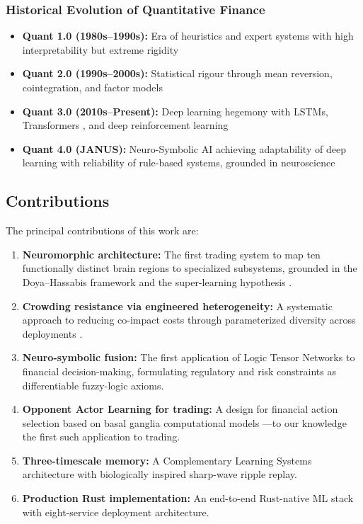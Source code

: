\documentclass[12pt, a4paper]{article}
\begin{document}
\subsubsection*{Historical Evolution of Quantitative Finance}

\begin{itemize}
	\item \textbf{Quant 1.0 (1980s--1990s):} Era of heuristics and expert systems with high interpretability but extreme rigidity
	\item \textbf{Quant 2.0 (1990s--2000s):} Statistical rigour through mean reversion, cointegration, and factor models \citep{fama1993common}
	\item \textbf{Quant 3.0 (2010s--Present):} Deep learning hegemony with LSTMs, Transformers \citep{vaswani2017attention}, and deep reinforcement learning \citep{sutton2018reinforcement}
	\item \textbf{Quant 4.0 (JANUS):} Neuro-Symbolic AI achieving adaptability of deep learning with reliability of rule-based systems, grounded in neuroscience
\end{itemize}

\subsection{Contributions}
\label{sec:contributions}

The principal contributions of this work are:

\begin{enumerate}
	\item \textbf{Neuromorphic architecture:} The first trading system to map ten functionally distinct brain regions to specialized subsystems, grounded in the Doya--Hassabis framework \citep{doya1999computations, hassabis2017neuroscience} and the super-learning hypothesis \citep{caligiore2019superlearning}.
	\item \textbf{Crowding resistance via engineered heterogeneity:} A systematic approach to reducing co-impact costs through parameterized diversity across deployments \citep{wagner2011diversity, demiguel2021crowding}.
	\item \textbf{Neuro-symbolic fusion:} The first application of Logic Tensor Networks \citep{badreddine2022logic} to financial decision-making, formulating regulatory and risk constraints as differentiable fuzzy-logic axioms.
	\item \textbf{Opponent Actor Learning for trading:} A design for financial action selection based on basal ganglia computational models \citep{collins2014opponent, jaskir2023opal}---to our knowledge the first such application to trading.
	\item \textbf{Three-timescale memory:} A Complementary Learning Systems architecture \citep{mcclelland1995complementary, kumaran2016cls} with biologically inspired sharp-wave ripple replay.
	\item \textbf{Production Rust implementation:} An end-to-end Rust-native ML stack with eight-service deployment architecture.
\end{enumerate}
\end{document}
